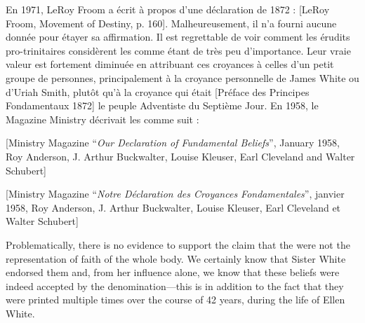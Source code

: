 En 1971, LeRoy Froom a écrit à propos d'une déclaration de 1872 : [LeRoy Froom, Movement of Destiny, p. 160]. Malheureusement, il n'a fourni aucune donnée pour étayer sa affirmation. Il est regrettable de voir comment les érudits pro-trinitaires considèrent les  comme étant de très peu d'importance. Leur vraie valeur est fortement diminuée en attribuant ces croyances à celles d'un petit groupe de personnes, principalement à la croyance personnelle de James White ou d'Uriah Smith, plutôt qu'à la croyance qui était [Préface des Principes Fondamentaux 1872] le peuple Adventiste du Septième Jour. En 1958, le Magazine Ministry décrivait les  comme suit :


[Ministry Magazine “\textit{Our Declaration of Fundamental Beliefs}”, January 1958, Roy Anderson, J. Arthur Buckwalter, Louise Kleuser, Earl Cleveland and Walter Schubert]


[Ministry Magazine “\textit{Notre Déclaration des Croyances Fondamentales}”, janvier 1958, Roy Anderson, J. Arthur Buckwalter, Louise Kleuser, Earl Cleveland et Walter Schubert]


Problematically, there is no evidence to support the claim that the  were not the representation of faith of the whole body. We certainly know that Sister White endorsed them and, from her influence alone, we know that these beliefs were indeed accepted by the denomination—this is in addition to the fact that they were printed multiple times over the course of 42 years, during the life of Ellen White.



